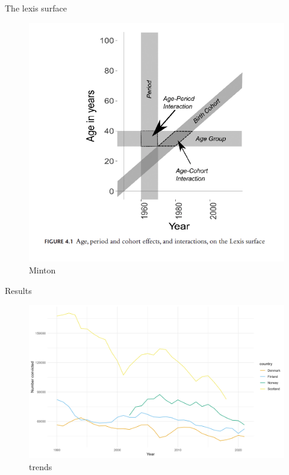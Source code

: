 \documentclass[
  ignorenonframetext,
]{beamer}
\begin{document}
\begin{frame}{The lexis surface}
\protect\hypertarget{the-lexis-surface}{}
\begin{figure}

{\centering \includegraphics{resources/minton_2020_lexis.png}

}

\caption{Minton}

\end{figure}
\end{frame}

\begin{frame}{Results}
\protect\hypertarget{results}{}
\begin{figure}

{\centering \includegraphics{figures/overall_conviction_trends.png}

}

\caption{trends}

\end{figure}
\end{frame}
\end{document}
